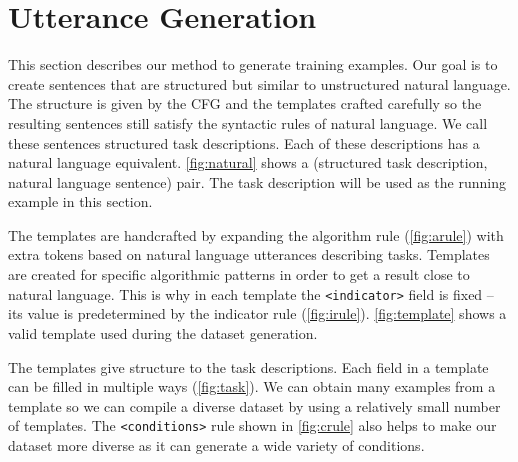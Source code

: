 \section{Utterance Generation}\label{sec:STDT}

This section describes our method to generate training examples. Our goal is to
create sentences that are structured but similar to unstructured natural
language. The structure is given by the CFG and the templates crafted carefully
so the resulting sentences still satisfy the syntactic rules of natural
language. We call these sentences structured task descriptions. Each of these
descriptions has a natural language equivalent. \cref{fig:natural} shows a
(structured task description, natural language sentence) pair. The task
description will be used as the running example in this section.


The templates are handcrafted by expanding the algorithm rule (\cref{fig:arule})
with extra tokens based on natural language utterances describing tasks.
Templates are created for specific algorithmic patterns in order to get a result
close to natural language. This is why in each template the \verb|<indicator>|
field is fixed -- its value is predetermined by the indicator rule
(\cref{fig:irule}). \cref{fig:template} shows a valid template used during the
dataset generation.




The templates give structure to the task descriptions. Each field in a template
can be filled in multiple ways (\cref{fig:task}). We can obtain many examples
from a template so we can compile a diverse dataset by using a relatively small
number of templates. The \texttt{<conditions>} rule shown in \cref{fig:crule}
also helps to make our dataset more diverse as it can generate a wide variety of
conditions.

